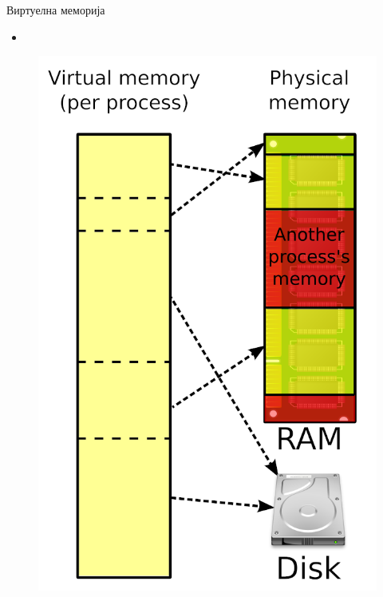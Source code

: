 \documentclass[xcolor=table]{beamer}
\begin{document}
    \begin{frame}[allowframebreaks]{Виртуелна меморија}
        \begin{itemize}
            \item
        \end{itemize}
        
        \framebreak
        
        \begin{figure}
            \centering
            \includegraphics[width=\textwidth,height=0.8\textheight,keepaspectratio]{images/virtmem.png}
            \label{fig:virtmem}
        \end{figure}
    \end{frame}
    
\end{document}
